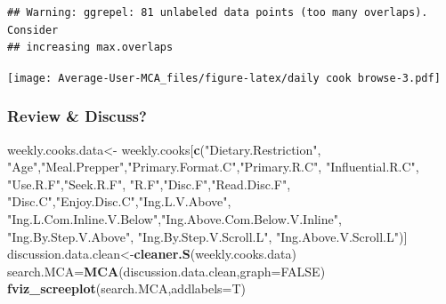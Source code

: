 \documentclass[
]{article}
\newenvironment{Shaded}{\begin{snugshade}}{\end{snugshade}}
\newcommand{\DataTypeTok}[1]{\textcolor[rgb]{0.13,0.29,0.53}{#1}}
\newcommand{\KeywordTok}[1]{\textcolor[rgb]{0.13,0.29,0.53}{\textbf{#1}}}
\newcommand{\NormalTok}[1]{#1}
\newcommand{\OtherTok}[1]{\textcolor[rgb]{0.56,0.35,0.01}{#1}}
\newcommand{\StringTok}[1]{\textcolor[rgb]{0.31,0.60,0.02}{#1}}
\begin{document}
\begin{Shaded}
\end{Shaded}

\begin{verbatim}
## Warning: ggrepel: 81 unlabeled data points (too many overlaps). Consider
## increasing max.overlaps
\end{verbatim}

\texttt{[image: Average-User-MCA\_files/figure-latex/daily cook browse-3.pdf]}

\hypertarget{review-discuss-4}{%
\subsubsection{Review \& Discuss?}\label{review-discuss-4}}

\begin{Shaded}
\begin{Highlighting}[]
\NormalTok{weekly.cooks.data<-}\StringTok{ }\NormalTok{weekly.cooks[}\KeywordTok{c}\NormalTok{(}\StringTok{"Dietary.Restriction"}\NormalTok{, }\StringTok{"Age"}\NormalTok{,}\StringTok{"Meal.Prepper"}\NormalTok{,}\StringTok{"Primary.Format.C"}\NormalTok{,}\StringTok{"Primary.R.C"}\NormalTok{, }
                                   \StringTok{"Influential.R.C"}\NormalTok{, }\StringTok{"Use.R.F"}\NormalTok{,}\StringTok{"Seek.R.F"}\NormalTok{, }\StringTok{"R.F"}\NormalTok{,}\StringTok{"Disc.F"}\NormalTok{,}\StringTok{"Read.Disc.F"}\NormalTok{,}
                                   \StringTok{"Disc.C"}\NormalTok{,}\StringTok{"Enjoy.Disc.C"}\NormalTok{,}\StringTok{"Ing.L.V.Above"}\NormalTok{,}
            \StringTok{"Ing.L.Com.Inline.V.Below"}\NormalTok{,}\StringTok{"Ing.Above.Com.Below.V.Inline"}\NormalTok{,  }\StringTok{"Ing.By.Step.V.Above"}\NormalTok{,  }\StringTok{"Ing.By.Step.V.Scroll.L"}\NormalTok{,}
            \StringTok{"Ing.Above.V.Scroll.L"}\NormalTok{)]}
\NormalTok{discussion.data.clean<-}\KeywordTok{cleaner.S}\NormalTok{(weekly.cooks.data)}
\NormalTok{search.MCA=}\KeywordTok{MCA}\NormalTok{(discussion.data.clean,}\DataTypeTok{graph=}\OtherTok{FALSE}\NormalTok{)}
\KeywordTok{fviz_screeplot}\NormalTok{(search.MCA,}\DataTypeTok{addlabels=}\NormalTok{T)}
\end{Highlighting}
\end{Shaded}
\end{document}
